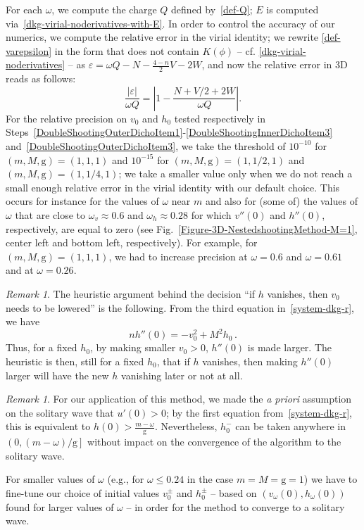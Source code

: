 \documentclass[12pt]{extarticle}
\newcommand{\coupling}{\mathrm{g}}
\theoremstyle{plain}
\theoremstyle{remark}
\newtheorem{remark}[lemma]{Remark}
\begin{document}
For each $\omega$,
we compute the charge $Q$
defined by~\eqref{def-Q};
$E$ is computed via~\eqref{dkg-virial-noderivatives-with-E}.
In order to control the accuracy of our numerics, we compute the relative error
in the virial identity;
we rewrite \eqref{def-varepsilon}
in the form
that does not contain
$K(\phi)$ -- cf. \eqref{dkg-virial-noderivatives} -- as
$\varepsilon = \omega Q - N - \frac{4-n}{2} V - 2 W$,
and now the relative error in 3D reads as follows:
\begin{equation}\label{relative_error_shooting_3D}
\frac{|\varepsilon|}{\omega Q} =
\left| 1 -  \frac{N + V/2 + 2 W}{\omega Q} \right|.
\end{equation}
For the relative precision on $v_0$ and $h_0$
tested respectively in Steps~\ref{DoubleShootingOuterDichoItem1}-\ref{DoubleShootingInnerDichoItem3}
and~\ref{DoubleShootingOuterDichoItem3},
we take
the threshold of $10^{-10}$
for $(m, M, \coupling) = (1,1,1)$ and $10^{-15}$ for $(m, M, \coupling) = (1,1/2,1)$ and $(m, M, \coupling) = (1,1/4,1)$;
we take a smaller value only when we do not reach a small enough relative error in the virial identity with our default choice. This occurs for instance for the values of $\omega$
near $m$
and also for (some of) the values of
$\omega$ that are close to
$\omega_v\approx 0.6$
and $\omega_h\approx 0.28$
for which $v''(0)$ and $h''(0)$,
respectively, are equal to zero
(see Fig.~\ref{Figure-3D-NestedshootingMethod-M=1}, center left and bottom left,
respectively).
For example,
for $(m, M, \coupling) = (1,1,1)$, we had
to increase precision at $\omega = 0.6$ and $\omega=0.61$
and at $\omega=0.26$.

\begin{remark}\label{Rmk_nested_shooting_heuristic}
    The heuristic argument behind the decision ``if $h$ vanishes, then $v_0$ needs to be lowered'' is the following.
    From the third equation in~\eqref{system-dkg-r}, we have
    \[
        n h''(0) = - v_0^2 + M^2 h_0\,.
    \]
    Thus, for a fixed $h_0$, by making smaller $v_0>0$, $h''(0)$ is made larger. The heuristic is then, still for a fixed $h_0$, that if $h$ vanishes, then making $h''(0)$ larger will have the new $h$ vanishing later or not at all.
\end{remark}

\begin{remark}
\label{remark-small-omega}
For our application of this method, we made the
\emph{a priori} assumption on the solitary wave that $u'(0)>0$;
by the first equation
from~\eqref{system-dkg-r},
this is equivalent to
$h(0) > \frac{m-\omega}{\coupling}$. Nevertheless, $h_0^-$ can be taken anywhere in $\left(0, (m-\omega)/\coupling \right]$ without impact on the convergence of the algorithm to the solitary wave.

For smaller values of $\omega$
(e.g., for $\omega\le 0.24$
in the case $m=M=\coupling=1$)
we have to fine-tune our choice of initial values $v_0^\pm$ and $h_0^\pm$ -- based on $(v_\omega(0), h_\omega(0))$ found for larger values of $\omega$
-- in order for the method to converge to a solitary wave.
\end{remark}
\end{document}
